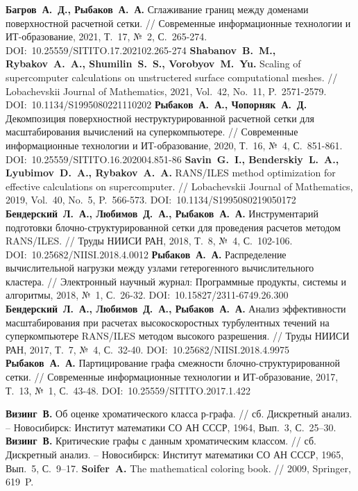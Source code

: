 \begin{thebibliography}{99}
%
\textbf{Багров~А.~Д., Рыбаков~А.~А.} Сглаживание границ между доменами поверхностной расчетной сетки. // Современные информационные технологии и ИТ-образование, 2021, Т.~17, №~2, С.~265-274. DOI:~10.25559/SITITO.17.202102.265-274
%
\textbf{Shabanov~B.~M., Rybakov~A.~A., Shumilin~S.~S., Vorobyov~M.~Yu.} Scaling of supercomputer calculations on unstructered surface computational meshes. // Lobachevskii Journal of Mathematics, 2021, Vol.~42, No.~11, P.~2571-2579. DOI:~10.1134/S1995080221110202
%
\textbf{Рыбаков~А.~А., Чопорняк~А.~Д.} Декомпозиция поверхностной неструктурированной расчетной сетки для масштабирования вычислений на суперкомпьютере. // Современные информационные технологии и ИТ-образование, 2020, Т.~16, №~4, С.~851-861. DOI:~10.25559/SITITO.16.202004.851-86
%
\textbf{Savin~G.~I., Benderskiy~L.~A., Lyubimov~D.~A., Rybakov~A.~A.} RANS/ILES method optimization for effective calculations on supercomputer. // Lobachevskii Journal of Mathematics, 2019, Vol.~40, No.~5, P.~566-573. DOI:~10.1134/S1995080219050172
%
\textbf{Бендерский~Л.~А., Любимов~Д.~А., Рыбаков~А.~А.} Инструментарий подготовки блочно-структурированной сетки для проведения расчетов методом RANS/ILES. // Труды НИИСИ РАН, 2018, Т.~8, №~4, С.~102-106. DOI:~10.25682/NIISI.2018.4.0012
%
\textbf{Рыбаков~А.~А.} Распределение вычислительной нагрузки между узлами гетерогенного вычислительного кластера. // Электронный научный журнал: Программные продукты, системы и алгоритмы, 2018, №~1, С.~26-32. DOI:~10.15827/2311-6749.26.300
%
\textbf{Бендерский~Л.~А., Любимов~Д.~А., Рыбаков~А.~А.} Анализ эффективности масштабирования при расчетах высокоскоростных турбулентных течений на суперкомпьютере RANS/ILES методом высокого разрешения. // Труды НИИСИ РАН, 2017, Т.~7, №~4, С.~32-40. DOI:~10.25682/NIISI.2018.4.9975
%
\textbf{Рыбаков~А.~А.} Партицирование графа смежности блочно-структурированной сетки. // Современные информационные технологии и ИТ-образование, 2017, Т.~13, №~1, С.~43-48. DOI:~10.25559/SITITO.2017.1.422
%





%
\textbf{Визинг~В.} Об оценке хроматического класса р-графа. // сб. Дискретный анализ. -- Новосибирск: Институт математики СО АН СССР, 1964, Вып.~3, С.~25–30.
%
\textbf{Визинг~В.} Критические графы с данным хроматическим классом. // сб. Дискретный анализ. -- Новосибирск: Институт математики СО АН СССР, 1965, Вып.~5, С.~9–17.
%
\textbf{Soifer~A.} The mathematical coloring book. // 2009, Springer, 619~P.
%


\end{thebibliography}
